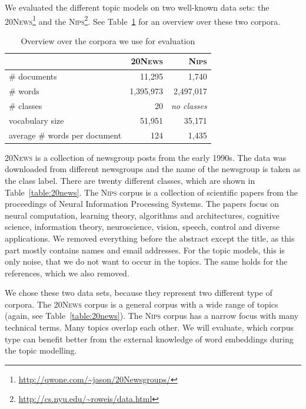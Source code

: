 \documentclass[
        a4paper,
        titlepage,
        twoside,
        parskip,
        numbers=noenddot
        ]{scrbook}
\newcommand{\ra}[1]{\renewcommand{\arraystretch}{#1}}
\theoremstyle{break}
\begin{document}
We evaluated the different topic models on two well-known data sets: the \textsc{20News}\footnote{\url{http://qwone.com/~jason/20Newsgroups/}} and the \textsc{Nips}\footnote{\url{http://cs.nyu.edu/~roweis/data.html}}.
See Table~\ref{table:data_sets} for an overview over these two corpora.
\begin{table}[]
  \ra{1.3}
  \centering
  \caption{Overview over the corpora we use for evaluation}
  \label{table:data_sets}
  \begin{tabular}{@{}lrr@{}}
    \toprule
                               & \textsc{20News} & \textsc{Nips}                \\ \midrule
                               \# documents                  & 11,295            & 1,740               \\
                               \# words                      & 1,395,973         & 2,497,017           \\
                               \# classes                    & 20                & \textit{no classes} \\
                               vocabulary size               & 51,951            & 35,171              \\
                               average \# words per document & 124               & 1,435               \\
                               \bottomrule
  \end{tabular}
\end{table}
\textsc{20News} is a collection of newsgroup posts from the early 1990s.
The data was downloaded from different newsgroups and the name of the newsgroup is taken as the class label.
There are twenty different classes, which are shown in Table~\ref{table:20news}.
The \textsc{Nips} corpus is a collection of scientific papers from the proceedings of Neural Information Processing Systems.
The papers focus on neural computation, learning theory, algorithms and architectures, cognitive science, information theory, neuroscience, vision, speech, control and diverse applications.
We removed everything before the abstract except the title, as this part mostly contains names and email addresses.
For the topic models, this is only noise, that we do not want to occur in the topics.
The same holds for the references, which we also removed.

We chose these two data sets, because they represent two different type of corpora.
The \textsc{20News} corpus is a general corpus with a wide range of topics (again, see Table~\ref{table:20news}).
The \textsc{Nips} corpus has a narrow focus with many technical terms.
Many topics overlap each other.
We will evaluate, which corpus type can benefit better from the external knowledge of word embeddings during the topic modelling.
\end{document}
